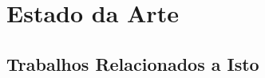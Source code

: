 \chapter{Estado da Arte}\label{cap:estArte}

\section{Trabalhos Relacionados a Isto}\label{sec:primTrab}
